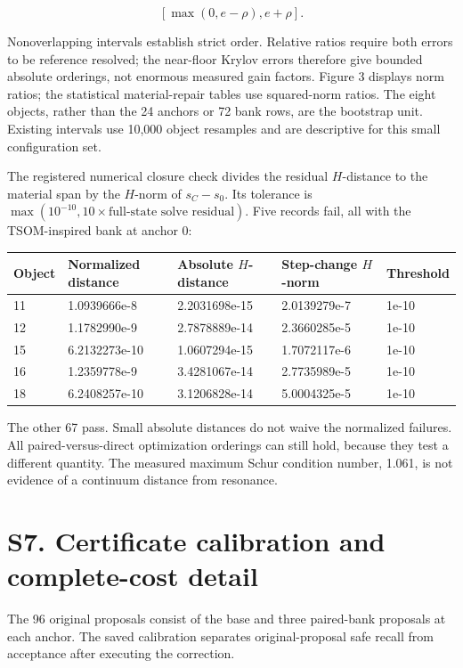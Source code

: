 \documentclass[11pt]{article}
\begin{document}
\[
[\max(0,e-\rho),e+\rho]. \tag{S14}
\]

Nonoverlapping intervals establish strict order. Relative ratios require both errors to be reference resolved; the near-floor Krylov errors therefore give bounded absolute orderings, not enormous measured gain factors. Figure 3 displays norm ratios; the statistical material-repair tables use squared-norm ratios. The eight objects, rather than the 24 anchors or 72 bank rows, are the bootstrap unit. Existing intervals use 10,000 object resamples and are descriptive for this small configuration set.

The registered numerical closure check divides the residual \(H\)-distance to the material span by the \(H\)-norm of \(s_C-s_0\). Its tolerance is \(\max(10^{-10},10\times\text{full-state solve residual})\). Five records fail, all with the TSOM-inspired bank at anchor 0:

\begin{table}[tbp]\centering\footnotesize\setlength{\tabcolsep}{3pt}
\begin{tabularx}{\linewidth}{lXXXX}\toprule
Object & Normalized distance & Absolute \(H\)-distance & Step-change \(H\)-norm & Threshold \\\midrule
11 & 1.0939666e-8 & 2.2031698e-15 & 2.0139279e-7 & 1e-10 \\
12 & 1.1782990e-9 & 2.7878889e-14 & 2.3660285e-5 & 1e-10 \\
15 & 6.2132273e-10 & 1.0607294e-15 & 1.7072117e-6 & 1e-10 \\
16 & 1.2359778e-9 & 3.4281067e-14 & 2.7735989e-5 & 1e-10 \\
18 & 6.2408257e-10 & 3.1206828e-14 & 5.0004325e-5 & 1e-10 \\
\bottomrule\end{tabularx}
\end{table}

The other 67 pass. Small absolute distances do not waive the normalized failures. All paired-versus-direct optimization orderings can still hold, because they test a different quantity. The measured maximum Schur condition number, 1.061, is not evidence of a continuum distance from resonance.

\section*{S7. Certificate calibration and complete-cost detail}

The 96 original proposals consist of the base and three paired-bank proposals at each anchor. The saved calibration separates original-proposal safe recall from acceptance after executing the correction.
\end{document}
